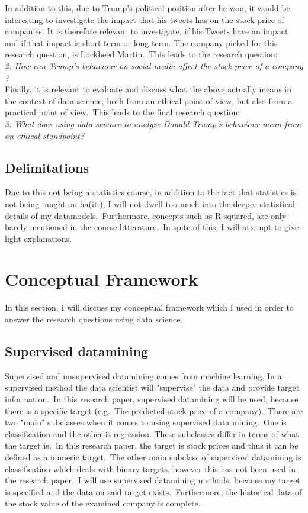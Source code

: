 \documentclass[12pt]{article}
\begin{document}
In addition to this, due to Trump's political position after he won, it would be interesting to investigate the impact that his tweets has on the stock-price of companies. It is therefore relevant to investigate, if his Tweets have an impact and if that impact is short-term or long-term. The company picked for this research question, is Lockheed Martin.\ This leads to the research question:\\

\textit{2. How can Trump's behaviour on social media affect the stock price of a company ?} \\

Finally, it is relevant to evaluate and discuss what the above actually means in the context of data science, both from an ethical point of view, but also from a practical point of view.\ This leads to the final research question: \\

\textit{3. What does using data science to analyze Donald Trump's behaviour mean from an ethical standpoint?}\\
 
\subsection{Delimitations}
Due to this not being a statistics course, in addition to the fact that statistics is not being taught on ha(it.), I will not dwell too much into the deeper statistical details of my datamodels.\ Furthermore, concepts such as R-squared,  are only barely mentioned in the course litterature.\ In spite of this, I will attempt to give light explanations. 

\section{Conceptual Framework}
In this section, I will discuss my conceptual framework which I used in order to answer the research questions using data science.

\subsection{Supervised datamining}
Supervised and unsupervised datamining comes from machine learning. In a supervised method the data scientist will "supervise" the data and provide target information.\ In this research paper, supervised datamining will be used, because there is a specific target (e.g.\ The predicted stock price of a company).\  There are two "main" subclasses when it comes to using supervised data mining.\ One is classification and the other is regression. These subclasses differ in terms of what the target is.\ In this research paper, the target is stock prices and thus it can be defined as a numeric target.\ The other main subclass of supervised datamining is classification which deals with binary targets, however this has not been used in the research paper.\ I will use supervised datamining methods, because my target is specified and the data on said target exists.\ Furthermore, the historical data of the stock value of the examined company is complete.
\end{document}
